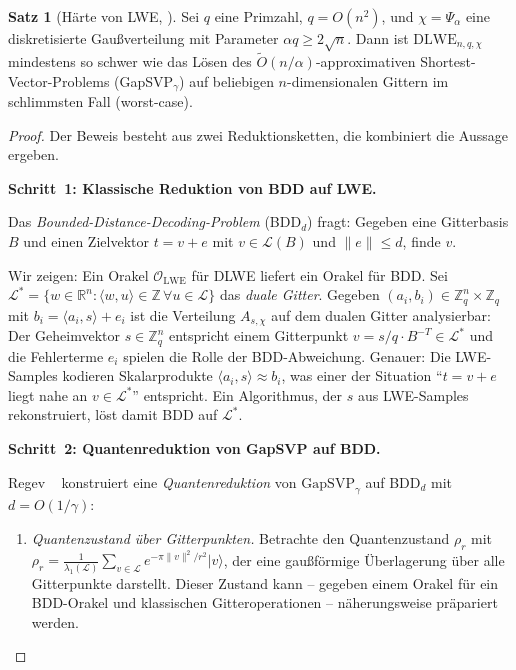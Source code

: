 ﻿\documentclass[a4paper,12pt]{article}
\theoremstyle{definition}
\newtheorem{satz}{Satz}[section]
\begin{document}
\begin{satz}[Härte von LWE, \cite{Reg05}]
\label{satz:lwe}
Sei $q$ eine Primzahl, $q = O(n^2)$, und $\chi = \Psi_\alpha$ eine diskretisierte
Gaußverteilung mit Parameter $\alpha q \geq 2\sqrt{n}$. Dann ist
$\mathrm{DLWE}_{n,q,\chi}$ mindestens so schwer wie das Lösen des
$\tilde{O}(n/\alpha)$-approximativen Shortest-Vector-Problems
(GapSVP$_\gamma$) auf beliebigen $n$-dimensionalen Gittern
im schlimmsten Fall (worst-case).
\end{satz}

\begin{proof}
Der Beweis besteht aus zwei Reduktionsketten, die kombiniert die Aussage ergeben.

\textbf{Schritt~1: Klassische Reduktion von BDD auf LWE.}

Das \emph{Bounded-Distance-Decoding-Problem} (BDD$_d$) fragt: Gegeben eine Gitterbasis
$B$ und einen Zielvektor $t = v + e$ mit $v \in \mathcal{L}(B)$ und
$\|e\| \leq d$, finde $v$.

Wir zeigen: Ein Orakel $\mathcal{O}_\mathrm{LWE}$ für DLWE liefert ein Orakel für BDD.
Sei $\mathcal{L}^* = \{w \in \mathbb{R}^n : \langle w, u \rangle \in \mathbb{Z}\,
\forall u \in \mathcal{L}\}$ das \emph{duale Gitter}. Gegeben
$(a_i, b_i) \in \mathbb{Z}_q^n \times \mathbb{Z}_q$ mit $b_i = \langle a_i, s \rangle + e_i$
ist die Verteilung $A_{s,\chi}$ auf dem dualen Gitter analysierbar:
Der Geheimvektor $s \in \mathbb{Z}_q^n$ entspricht einem Gitterpunkt
$v = s/q \cdot B^{-T} \in \mathcal{L}^*$ und die Fehlerterme $e_i$
spielen die Rolle der BDD-Abweichung. Genauer: Die LWE-Samples kodieren
Skalarprodukte $\langle a_i, s \rangle \approx b_i$, was einer der
Situation ``$t = v + e$ liegt nahe an $v \in \mathcal{L}^*$'' entspricht.
Ein Algorithmus, der $s$ aus LWE-Samples rekonstruiert, löst damit BDD auf $\mathcal{L}^*$.

\textbf{Schritt~2: Quantenreduktion von GapSVP auf BDD.}

Regev ~\cite{Reg05} konstruiert eine \emph{Quantenreduktion}
von $\mathrm{GapSVP}_\gamma$ auf BDD$_d$ mit $d = O(1/\gamma)$:

\begin{enumerate}
\item[(a)] \emph{Quantenzustand über Gitterpunkten.}
Betrachte den Quantenzustand $\rho_r$ mit $\rho_r = \frac{1}{\lambda_1(\mathcal{L})}
\sum_{v \in \mathcal{L}} e^{-\pi \|v\|^2 / r^2} |v\rangle$, der eine gaußförmige
Überlagerung über alle Gitterpunkte darstellt. Dieser Zustand kann -- gegeben
einem Orakel für ein BDD-Orakel und klassischen Gitteroperationen --
näherungsweise präpariert werden.


\end{enumerate}
\end{proof}
\end{document}
